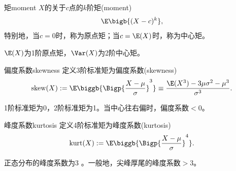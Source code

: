 \begin{definition}{矩}{moment}
	$X$的关于$c$点的$k$阶矩(moment)
	\begin{equation}
		\E\bigb{(X-c)^k},
	\end{equation}
	特别地，当$c=0$时，称为原点矩；当$c=\E(X)$时，称为中心矩。
\end{definition}
\begin{remark}
	$\E(X)$为1阶原点矩，$\Var(X)$为2阶中心矩。
\end{remark}
\begin{definition}{偏度系数}{skewness}
	定义3阶标准矩为偏度系数(skewness)
	\begin{equation}
		\label{eqn:skewness}
		\mathrm{skew}(X):=\E\biggb{\Bigp{\frac{X-\mu}\sigma}^3}
		\equiv\frac{\E(X^3)-3\mu\sigma^2-\mu^3}{\sigma^3}.
	\end{equation}
\end{definition}
1阶标准矩为0，2阶标准矩为1。当中心往右偏时，偏度系数$<0$。
\begin{definition}{峰度系数}{kurtosis}
	定义4阶标准矩为峰度系数(kurtosis)
	\begin{equation}
		\mathrm{kurt}(X):=\E\biggb{\Bigp{\frac{X-\mu}\sigma}^4}.
	\end{equation}
\end{definition}
正态分布的峰度系数为3%
。一般地，尖峰厚尾的峰度系数$>3$。
